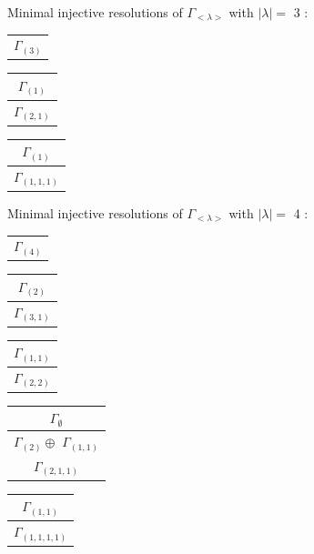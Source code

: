 \documentclass[main.tex]{subfiles}
\begin{document}
\bigskip
Minimal injective resolutions of $\Gamma_{<\lambda>}$ with $|\lambda| = $ 3 : \\
\begin{minipage}{.3\textwidth}
\centering
\begin{tabular}{c}
$\Gamma_{(
3
)}$
\\
\end{tabular}\end{minipage}
\begin{minipage}{.3\textwidth}
\centering
\begin{tabular}{c}
$\Gamma_{(
1
)}$
\\ \hline
$\Gamma_{(
2 , 
1
)}$
\\
\end{tabular}\end{minipage}
\begin{minipage}{.3\textwidth}
\centering
\begin{tabular}{c}
$\Gamma_{(
1
)}$
\\ \hline
$\Gamma_{(
1 , 
1 , 
1
)}$
\\
\end{tabular}\end{minipage}

\bigskip
Minimal injective resolutions of $\Gamma_{<\lambda>}$ with $|\lambda| = $ 4 : \\
\begin{minipage}{.2\textwidth}
\centering
\begin{tabular}{c}
$\Gamma_{(
4
)}$
\\
\end{tabular}\end{minipage}
\begin{minipage}{.2\textwidth}
\centering
\begin{tabular}{c}
$\Gamma_{(
2
)}$
\\ \hline
$\Gamma_{(
3 , 
1
)}$
\\
\end{tabular}\end{minipage}
\begin{minipage}{.2\textwidth}
\centering
\begin{tabular}{c}
$\Gamma_{(
1 , 
1
)}$
\\ \hline
$\Gamma_{(
2 , 
2
)}$
\\
\end{tabular}\end{minipage}
\begin{minipage}{.2\textwidth}
\centering
\begin{tabular}{c}
$\Gamma_\emptyset$
\\ \hline
$\Gamma_{(
2
)} \oplus$
$\Gamma_{(
1 , 
1
)}$
\\ \hline
$\Gamma_{(
2 , 
1 , 
1
)}$
\\
\end{tabular}\end{minipage}
\begin{minipage}{.2\textwidth}
\centering
\begin{tabular}{c}
$\Gamma_{(
1 , 
1
)}$
\\ \hline
$\Gamma_{(
1 , 
1 , 
1 , 
1
)}$
\\
\end{tabular}\end{minipage}
\end{document}

